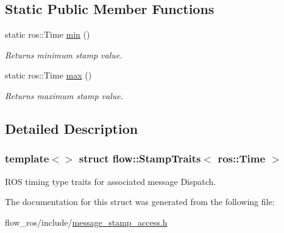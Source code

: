 \subsection*{Static Public Member Functions}
\begin{DoxyCompactItemize}
\item 
\mbox{\label{structflow_1_1_stamp_traits_3_01ros_1_1_time_01_4_a984be4e6f28eb45d7f7b8f88a4ccf009}} 
static ros\+::\+Time \hyperlink{structflow_1_1_stamp_traits_3_01ros_1_1_time_01_4_a984be4e6f28eb45d7f7b8f88a4ccf009}{min} ()
\begin{DoxyCompactList}\small\item\em Returns minimum stamp value. \end{DoxyCompactList}\item 
\mbox{\label{structflow_1_1_stamp_traits_3_01ros_1_1_time_01_4_ab2e686990f4e854ea6d343e5aa98cede}} 
static ros\+::\+Time \hyperlink{structflow_1_1_stamp_traits_3_01ros_1_1_time_01_4_ab2e686990f4e854ea6d343e5aa98cede}{max} ()
\begin{DoxyCompactList}\small\item\em Returns maximum stamp value. \end{DoxyCompactList}\end{DoxyCompactItemize}


\subsection{Detailed Description}
\subsubsection*{template$<$$>$\newline
struct flow\+::\+Stamp\+Traits$<$ ros\+::\+Time $>$}

R\+OS timing type traits for associated message Dispatch. 

The documentation for this struct was generated from the following file\+:\begin{DoxyCompactItemize}
\item 
flow\+\_\+ros/include/\hyperlink{message__stamp__access_8h}{message\+\_\+stamp\+\_\+access.\+h}\end{DoxyCompactItemize}
